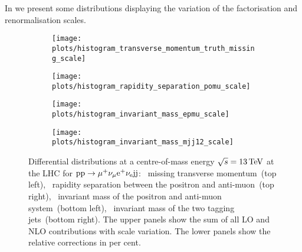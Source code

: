 \documentclass[a4article,11pt]{article}
\begin{document}
In  we present some
distributions displaying the variation of the factorisation and
renormalisation scales.  
%
\begin{figure}
        \setlength{\parskip}{-10pt}
        \begin{subfigure}{0.49\textwidth}
                \subcaption{}
                \texttt{[image: plots/histogram\_transverse\_momentum\_truth\_missing\_scale]}
                \label{plot:transverse_momentum_truth_missing_scale}
        \end{subfigure}
        \hfill
        \begin{subfigure}{0.49\textwidth}
                \subcaption{}
                \texttt{[image: plots/histogram\_rapidity\_separation\_pomu\_scale]}
                \label{plot:rapidity_separation_pomu_scale} 
        \end{subfigure}

        \begin{subfigure}{0.49\textwidth}
                \subcaption{}
                \texttt{[image: plots/histogram\_invariant\_mass\_epmu\_scale]}
                \label{plot:invariant_mass_epmu_scale}
        \end{subfigure}
        \hfill
        \begin{subfigure}{0.49\textwidth}
                \subcaption{}
                \texttt{[image: plots/histogram\_invariant\_mass\_mjj12\_scale]}
                \label{plot:invariant_mass_mjj12_scale} 
        \end{subfigure}
        
        \vspace*{-3ex}
        \caption{\label{fig:distributions_scale}%
                Differential distributions at a centre-of-mass energy $\sqrt{s}=13\,\text{TeV}$ at the LHC for $\text{p}\text{p}\to\mu^+\nu_\mu\text{e}^+\nu_{\text{e}}\text{j}\text{j}$: 
                ~missing transverse momentum~(top left), 
                ~rapidity separation between the positron and anti-muon~(top right),
                ~invariant mass
                of the positron and anti-muon system~(bottom left), 
                ~invariant mass of the two tagging jets~(bottom right).
                The upper panels show the sum of all LO and NLO contributions with scale variation.
                The lower panels show the relative corrections
                in per cent.  }
\end{figure}%
\end{document}
